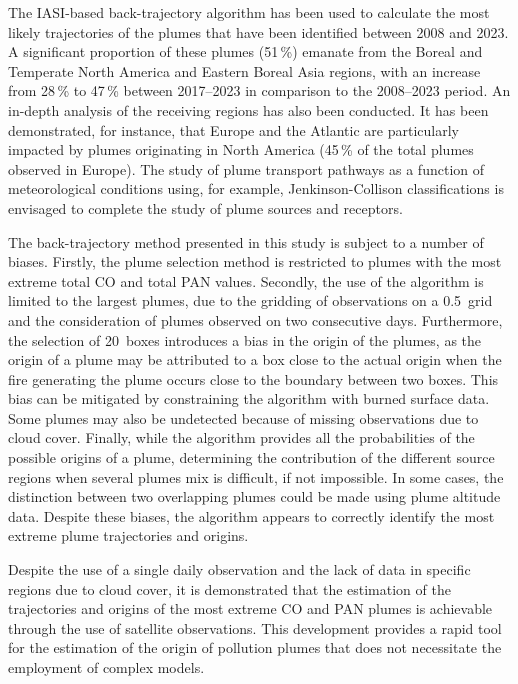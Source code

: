 \documentclass[acp, manuscript]{copernicus}
\begin{document}
The IASI-based back-trajectory algorithm has been used to calculate the most likely trajectories of the plumes that have been identified between 2008 and 2023. A significant proportion of these plumes (51\,\%) emanate from the Boreal and Temperate North America and Eastern Boreal Asia regions, with an increase from 28\,\% to 47\,\% between 2017--2023 in comparison to the 2008--2023 period. An in-depth analysis of the receiving regions has also been conducted. It has been demonstrated, for instance, that Europe and the Atlantic are particularly impacted by plumes originating in North America (45\,\% of the total plumes observed in Europe). The study of plume transport pathways as a function of meteorological conditions using, for example, Jenkinson-Collison classifications \citep{fernandez-granjaExploringLimitsJenkinson2023} is envisaged to complete the study of plume sources and receptors.



The back-trajectory method presented in this study is subject to a number of biases. Firstly, the plume selection method is restricted to plumes with the most extreme total CO and total PAN values. Secondly, the use of the algorithm is limited to the largest plumes, due to the gridding of observations on a 0.5\textdegree {}\textdegree\ grid and the consideration of plumes observed on two consecutive days. Furthermore, the selection of 20\textdegree {}\textdegree\ boxes introduces a bias in the origin of the plumes, as the origin of a plume may be attributed to a box close to the actual origin when the fire generating the plume occurs close to the boundary between two boxes. This bias can be mitigated by constraining the algorithm with burned surface data. Some plumes may also be undetected because of missing observations due to cloud cover. Finally, while the algorithm provides all the probabilities of the possible origins of a plume, determining the contribution of the different source regions when several plumes mix is difficult, if not impossible. In some cases, the distinction between two overlapping plumes could be made using plume altitude data. Despite these biases, the algorithm appears to correctly identify the most extreme plume trajectories and origins.  




Despite the use of a single daily observation and the lack of data in specific regions due to cloud cover, it is demonstrated that the estimation of the trajectories and origins of the most extreme CO and PAN plumes is achievable through the use of satellite observations. This development provides a rapid tool for the estimation of the origin of pollution plumes that does not necessitate the employment of complex models. 
\end{document}
